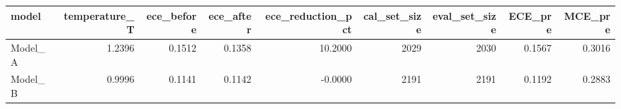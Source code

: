 \begin{tabular}{lrrrrrrrr}
\toprule
model & temperature_T & ece_before & ece_after & ece_reduction_pct & cal_set_size & eval_set_size & ECE_pre & MCE_pre \\
\midrule
Model_A & 1.2396 & 0.1512 & 0.1358 & 10.2000 & 2029 & 2030 & 0.1567 & 0.3016 \\
Model_B & 0.9996 & 0.1141 & 0.1142 & -0.0000 & 2191 & 2191 & 0.1192 & 0.2883 \\
\bottomrule
\end{tabular}

